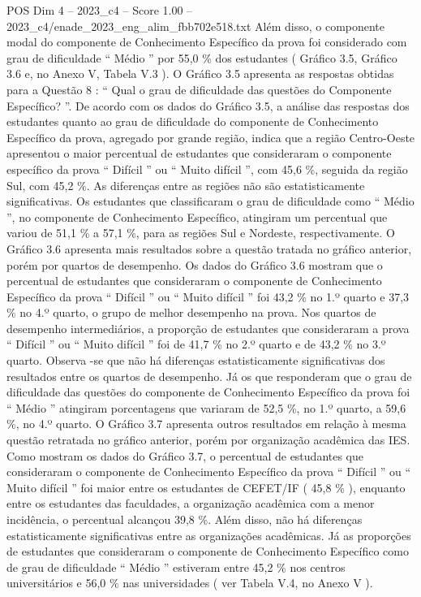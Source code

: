 \begin{textsample}{POS Dim 4 – 2023\_c4 – Score 1.00 – 2023\_c4/enade\_2023\_eng\_alim\_fbb702e518.txt}
Além disso, o componente modal do componente de Conhecimento Específico da prova foi considerado com grau de dificuldade “ Médio ” por 55,0 \% dos estudantes ( Gráfico 3.5, Gráfico 3.6 e, no Anexo V, Tabela V.3 ).
O Gráfico 3.5 apresenta as respostas obtidas para a Questão 8 : “ Qual o grau de dificuldade das questões do Componente Específico? ”.
De acordo com os dados do Gráfico 3.5, a análise das respostas dos estudantes quanto ao grau de dificuldade do componente de Conhecimento Específico da prova, agregado por grande região, indica que a região Centro-Oeste apresentou o maior percentual de estudantes que consideraram o componente específico da prova “ Difícil ” ou “ Muito difícil ”, com 45,6 \%, seguida da região Sul, com 45,2 \%.
As diferenças entre as regiões não são estatisticamente significativas.
Os estudantes que classificaram o grau de dificuldade como “ Médio ”, no componente de Conhecimento Específico, atingiram um percentual que variou de 51,1 \% a 57,1 \%, para as regiões Sul e Nordeste, respectivamente.
O Gráfico 3.6 apresenta mais resultados sobre a questão tratada no gráfico anterior, porém por quartos de desempenho.
Os dados do Gráfico 3.6 mostram que o percentual de estudantes que consideraram o componente de Conhecimento Específico da prova “ Difícil ” ou “ Muito difícil ” foi 43,2 \% no 1.º quarto e 37,3 \% no 4.º quarto, o grupo de melhor desempenho na prova.
Nos quartos de desempenho intermediários, a proporção de estudantes que consideraram a prova “ Difícil ” ou “ Muito difícil ” foi de 41,7 \% no 2.º quarto e de 43,2 \% no 3.º quarto.
Observa -se que não há diferenças estatisticamente significativas dos resultados entre os quartos de desempenho.
Já os que responderam que o grau de dificuldade das questões do componente de Conhecimento Específico da prova foi “ Médio ” atingiram porcentagens que variaram de 52,5 \%, no 1.º quarto, a 59,6 \%, no 4.º quarto.
O Gráfico 3.7 apresenta outros resultados em relação à mesma questão retratada no gráfico anterior, porém por organização acadêmica das IES.
Como mostram os dados do Gráfico 3.7, o percentual de estudantes que consideraram o componente de Conhecimento Específico da prova “ Difícil ” ou “ Muito difícil ” foi maior entre os estudantes de CEFET/IF ( 45,8 \% ), enquanto entre os estudantes das faculdades, a organização acadêmica com a menor incidência, o percentual alcançou 39,8 \%.
Além disso, não há diferenças estatisticamente significativas entre as organizações acadêmicas.
Já as proporções de estudantes que consideraram o componente de Conhecimento Específico como de grau de dificuldade “ Médio ” estiveram entre 45,2 \% nos centros universitários e 56,0 \% nas universidades ( ver Tabela V.4, no Anexo V ).

\end{textsample}
